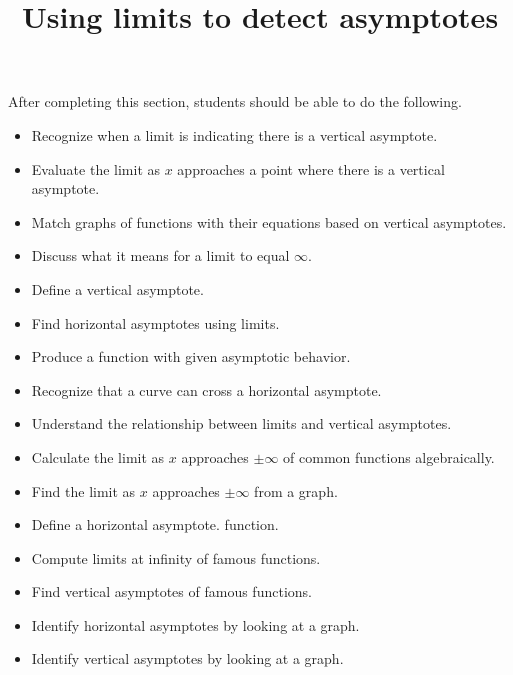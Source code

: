 \documentclass{ximera}
\title{Using limits to detect asymptotes}
\begin{document}
\begin{abstract}
\end{abstract}

\maketitle

\begin{sectionOutcomes}

After completing this section, students should be able to do the following.

\begin{itemize}
\item Recognize when a limit is indicating there is a vertical asymptote.
\item Evaluate the limit as $x$ approaches a point where there is a vertical asymptote.
\item Match graphs of functions with their equations based on vertical asymptotes.
\item Discuss what it means for a limit to equal $\infty$.
\item Define a vertical asymptote.
\item Find horizontal asymptotes using limits.
\item Produce a function with given asymptotic behavior.
\item Recognize that a curve can cross a horizontal asymptote.
\item Understand the relationship between limits and vertical asymptotes.
\item Calculate the limit as $x$ approaches $\pm \infty$ of common functions algebraically.
\item Find the limit as $x$ approaches $\pm \infty$ from a graph.
\item Define a horizontal asymptote.
  function.
\item Compute limits at infinity of famous functions.
\item Find vertical asymptotes of famous functions.
\item Identify horizontal asymptotes by looking at a graph.
\item Identify vertical asymptotes by looking at a graph.
\end{itemize}
\end{sectionOutcomes}
\end{document}

